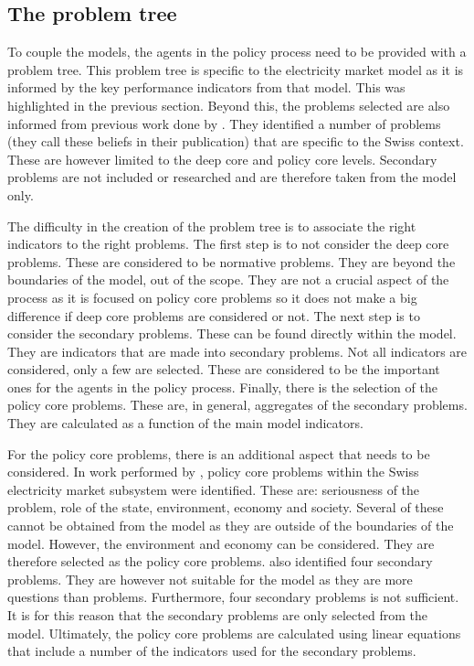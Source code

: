 
\subsection{The problem tree}
\label{ssec:interfaceProblemTree}

To couple the models, the agents in the policy process need to be provided with a problem tree. This problem tree is specific to the electricity market model as it is informed by the key performance indicators from that model. This was highlighted in the previous section. Beyond this, the problems selected are also informed from previous work done by \cite{markard2016socio}. They identified a number of problems (they call these beliefs in their publication) that are specific to the Swiss context. These are however limited to the deep core and policy core levels. Secondary problems are not included or researched and are therefore taken from the model only.

The difficulty in the creation of the problem tree is to associate the right indicators to the right problems. The first step is to not consider the deep core problems. These are considered to be normative problems. They are beyond the boundaries of the model, out of the scope. They are not a crucial aspect of the process as it is focused on policy core problems so it does not make a big difference if deep core problems are considered or not. The next step is to consider the secondary problems. These can be found directly within the model. They are indicators that are made into secondary problems. Not all indicators are considered, only a few are selected. These are considered to be the important ones for the agents in the policy process. Finally, there is the selection of the policy core problems. These are, in general, aggregates of the secondary problems. They are calculated as a function of the main model indicators.

For the policy core problems, there is an additional aspect that needs to be considered. In work performed by \citeauthor{markard2016socio}, policy core problems within the Swiss electricity market subsystem were identified. These are: seriousness of the problem, role of the state, environment, economy and society. Several of these cannot be obtained from the model as they are outside of the boundaries of the model. However, the environment and economy can be considered. They are therefore selected as the policy core problems. \cite{markard2016socio} also identified four secondary problems. They are however not suitable for the model as they are more questions than problems. Furthermore, four secondary problems is not sufficient. It is for this reason that the secondary problems are only selected from the model. Ultimately, the policy core problems are calculated using linear equations that include a number of the indicators used for the secondary problems.


